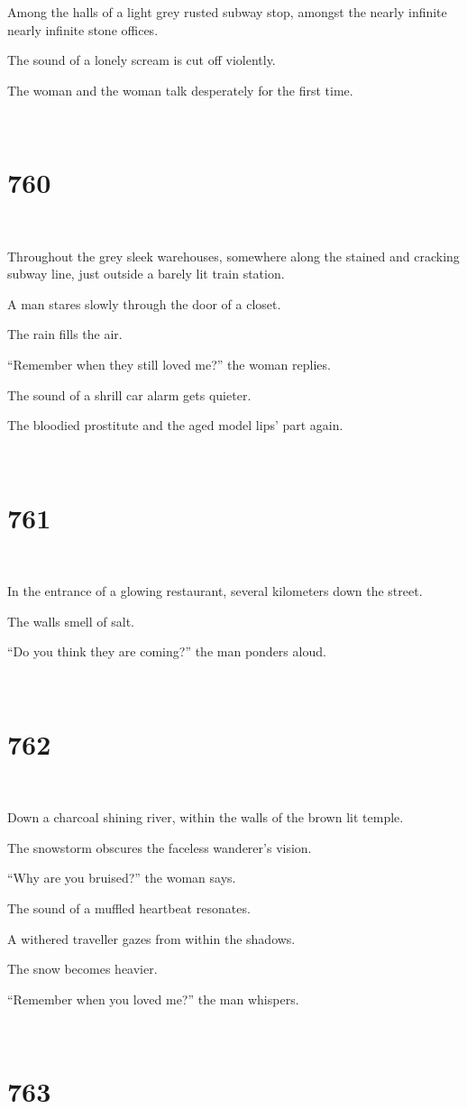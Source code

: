 \documentclass{report}
\begin{document}
Among the halls of a light grey rusted subway stop, amongst the nearly infinite nearly infinite stone offices.

The sound of a lonely scream is cut off violently.

The woman and the woman talk desperately for the first time.

~
\chapter*{760}
~

Throughout the grey sleek warehouses, somewhere along the stained and cracking subway line, just outside a barely lit train station.

A man stares slowly through the door of a closet.

The rain fills the air.

``Remember when they still loved me?'' the woman replies.

The sound of a shrill car alarm gets quieter.

The bloodied prostitute and the aged model lips' part again.

~
\chapter*{761}
~

In the entrance of a glowing restaurant, several kilometers down the street.

The walls smell of salt.

``Do you think they are coming?'' the man ponders aloud.

~
\chapter*{762}
~

Down a charcoal shining river, within the walls of the brown lit temple.

The snowstorm obscures the faceless wanderer's vision.

``Why are you bruised?'' the woman says.

The sound of a muffled heartbeat resonates.

A withered traveller gazes from within the shadows.

The snow becomes heavier.

``Remember when you loved me?'' the man whispers.

~
\chapter*{763}
~
\end{document}

